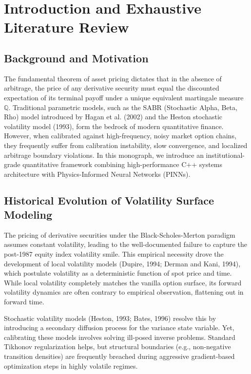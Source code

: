 \chapter{Introduction and Exhaustive Literature Review}
\section{Background and Motivation}
The fundamental theorem of asset pricing dictates that in the absence of arbitrage, the price of any derivative security must equal the discounted expectation of its terminal payoff under a unique equivalent martingale measure $\mathbb{Q}$. Traditional parametric models, such as the SABR (Stochastic Alpha, Beta, Rho) model introduced by Hagan et al. (2002) and the Heston stochastic volatility model (1993), form the bedrock of modern quantitative finance. However, when calibrated against high-frequency, noisy market option chains, they frequently suffer from calibration instability, slow convergence, and localized arbitrage boundary violations. In this monograph, we introduce an institutional-grade quantitative framework combining high-performance C++ systems architecture with Physics-Informed Neural Networks (PINNs).

\section{Historical Evolution of Volatility Surface Modeling}
The pricing of derivative securities under the Black-Scholes-Merton paradigm assumes constant volatility, leading to the well-documented failure to capture the post-1987 equity index volatility smile. This empirical necessity drove the development of local volatility models (Dupire, 1994; Derman and Kani, 1994), which postulate volatility as a deterministic function of spot price and time. While local volatility completely matches the vanilla option surface, its forward volatility dynamics are often contrary to empirical observation, flattening out in forward time. 

Stochastic volatility models (Heston, 1993; Bates, 1996) resolve this by introducing a secondary diffusion process for the variance state variable. Yet, calibrating these models involves solving ill-posed inverse problems. Standard Tikhonov regularization helps, but structural boundaries (e.g., non-negative transition densities) are frequently breached during aggressive gradient-based optimization steps in highly volatile regimes.


